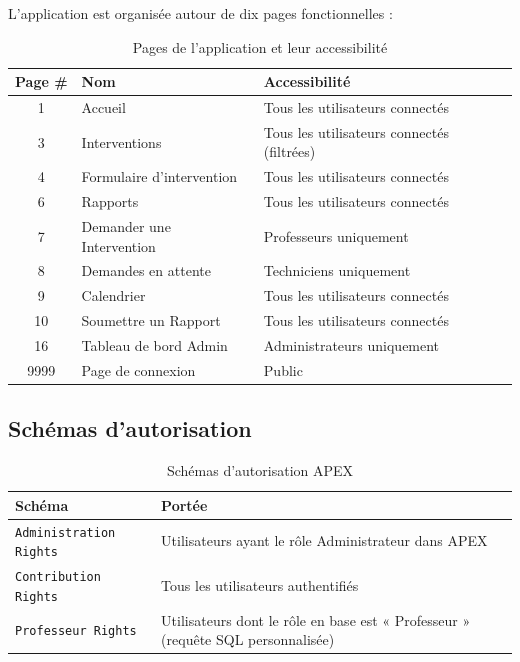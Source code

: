 \documentclass[12pt,a4paper,oneside]{report}
\begin{document}
L'application est organisée autour de dix pages fonctionnelles :

\begin{table}[H]
  \centering
  \caption{Pages de l'application et leur accessibilité}
  \begin{tabularx}{\linewidth}{@{}c X X@{}}
    \toprule
    \textbf{Page \#} & \textbf{Nom} & \textbf{Accessibilité} \\
    \midrule
    1  & Accueil & Tous les utilisateurs connectés \\
    3  & Interventions & Tous les utilisateurs connectés (filtrées) \\
    4  & Formulaire d'intervention & Tous les utilisateurs connectés \\
    6  & Rapports & Tous les utilisateurs connectés \\
    7  & Demander une Intervention & Professeurs uniquement \\
    8  & Demandes en attente & Techniciens uniquement \\
    9  & Calendrier & Tous les utilisateurs connectés \\
    10 & Soumettre un Rapport & Tous les utilisateurs connectés \\
    16 & Tableau de bord Admin & Administrateurs uniquement \\
    9999 & Page de connexion & Public \\
    \bottomrule
  \end{tabularx}
  \label{tab:pages}
\end{table}

\subsection{Schémas d'autorisation}

\begin{table}[H]
  \centering
  \caption{Schémas d'autorisation APEX}
  \begin{tabularx}{\linewidth}{@{}l X@{}}
    \toprule
    \textbf{Schéma} & \textbf{Portée} \\
    \midrule
    \texttt{Administration Rights} & Utilisateurs ayant le rôle Administrateur dans APEX \\
    \texttt{Contribution Rights} & Tous les utilisateurs authentifiés \\
    \texttt{Professeur Rights} & Utilisateurs dont le rôle en base est « Professeur » (requête SQL personnalisée) \\
    \bottomrule
  \end{tabularx}
  \label{tab:auth}
\end{table}
\end{document}
